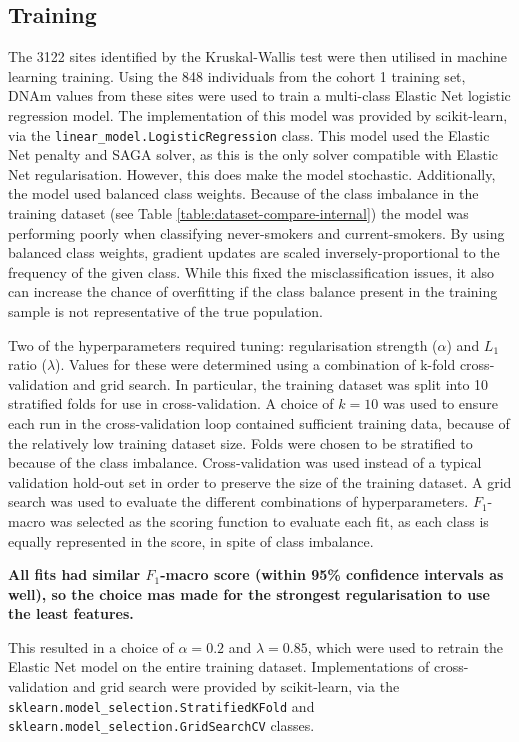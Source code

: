 \documentclass[draft]{article}
\begin{document}
\subsection{Training} \label{sec:training}

The \num{3122} sites identified by the Kruskal-Wallis test were then utilised in machine learning training. Using the 848 individuals from the cohort 1 training set, DNAm values from these sites were used to train a multi-class Elastic Net logistic regression model. The implementation of this model was provided by scikit-learn, via the \verb|linear_model.LogisticRegression| class. This model used the Elastic Net penalty and SAGA solver, as this is the only solver compatible with Elastic Net regularisation. However, this does make the model stochastic. Additionally, the model used balanced class weights. Because of the class imbalance in the training dataset (see Table \ref{table:dataset-compare-internal}) the model was performing poorly when classifying never-smokers and current-smokers. By using balanced class weights, gradient updates are scaled inversely-proportional to the frequency of the given class. While this fixed the misclassification issues, it also can increase the chance of overfitting if the class balance present in the training sample is not representative of the true population. 

Two of the hyperparameters required tuning: regularisation strength (\(\alpha\)) and \(L_1\) ratio (\(\lambda\)). Values for these were determined using a combination of k-fold cross-validation and grid search. In particular, the training dataset was split into 10 stratified folds for use in cross-validation. A choice of \(k=10\) was used to ensure each run in the cross-validation loop contained sufficient training data, because of the relatively low training dataset size. Folds were chosen to be stratified to because of the class imbalance. Cross-validation was used instead of a typical validation hold-out set in order to preserve the size of the training dataset. A grid search was used to evaluate the different combinations of hyperparameters. \(F_1\)-macro was selected as the scoring function to evaluate each fit, as each class is equally represented in the score, in spite of class imbalance. 

\textbf{All fits had similar \(F_1\)-macro score (within 95\% confidence intervals as well), so the choice mas made for the strongest regularisation to use the least features.}

This resulted in a choice of \(\alpha = 0.2\) and \(\lambda = 0.85\), which were used to retrain the Elastic Net model on the entire training dataset. Implementations of cross-validation and grid search were provided by scikit-learn, via the \verb|sklearn.model_selection.StratifiedKFold| and \verb|sklearn.model_selection.GridSearchCV| classes. 
\end{document}
